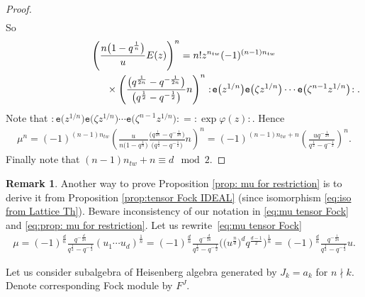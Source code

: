 \documentclass[pdftex]{sigma}
\numberwithin{equation}{section}
\theoremstyle{definition}
\newtheorem{Remark}[Theorem]{Remark}
\newcommand{\half}{\frac{1}{2}}
\newcommand{\se}{\mathtt{e}}
\begin{document}
\begin{proof}
\begin{gather*}
\end{gather*}
So
\begin{gather*}
\left( \frac{n\big(1-q^{\frac1n}\big)}{u} E(z)\right)^n = n! z^{n_{tw}} (-1)^{(n-1)n_{tw}} \\
\hphantom{\left( \frac{n\big(1-q^{\frac1n}\big)}{u} E(z)\right)^n =}{}
\times \left( \frac{\big(q^{\frac{1}{2n}}-q^{-\frac{1}{2n}}\big)}{\big(q^{\half}-q^{-\half}\big)} n \right)^n :\!\se\big(z^{1/n}\big) \se\big(\zeta z^{1/n}\big) \cdots \se\big(\zeta^{n-1} z^{1/n}\big)\!:.
\end{gather*}
Note that $:\!\se\big(z^{1/n}\big) \se\big(\zeta z^{1/n}\big) \cdots \se\big(\zeta^{n-1} z^{1/n}\big)\!: = :\!\exp{\varphi(z)}\!:$. Hence
\begin{gather*}
\mu^n = (-1)^{(n-1)n_{tw}} \left( \frac{u}{n\big(1-q^{\frac1n}\big)} \frac{\big(q^{\frac{1}{2n}}-q^{-\frac{1}{2n}}\big)}{\big(q^{\half}-q^{-\half}\big)} n \right)^n = (-1)^{(n-1)n_{tw}+n} \left( \frac{u q^{-\frac{1}{2n}}}{q^{\frac12}-q^{-\frac12}} \right)^n.
\end{gather*}
Finally note that $(n-1)n_{tw}+n \equiv d \mod{2}$.
\end{proof}

\begin{Remark}
Another way to prove Proposition \ref{prop: mu for restriction} is to derive it from Proposition \ref{prop:tensor Fock IDEAL} (since isomorphism \eqref{eq:iso from Lattice Th}). Beware inconsistency of our notation in \eqref{eq:mu tensor Fock} and \eqref{eq:prop: mu for restriction}. Let us rewrite~\eqref{eq:mu tensor Fock}
\begin{gather*}
\mu = (-1)^{\frac{d}{n}} \frac{q^{-\frac{d}{2n}}}{q^{\frac12}-q^{-\frac12}} (u_1 \cdots u_d)^{\frac1n} = (-1)^{\frac{d}{n}} \frac{q^{-\frac{d}{2n}}}{q^{\frac12}-q^{-\frac12}} \big( \big( u^{\frac{n}{d}}\big)^d q^{\frac{d-1}{2}}\big)^{\frac1n} = (-1)^{\frac{d}{n}} \frac{q^{-\frac{1}{2n}}}{q^{\frac12}-q^{-\frac12}} u.
\end{gather*}
\end{Remark}

Let us consider subalgebra of Heisenberg algebra generated by $J_k = a_k$ for $n \nmid k$. Denote corresponding Fock module by $F^J$.
\end{document}
